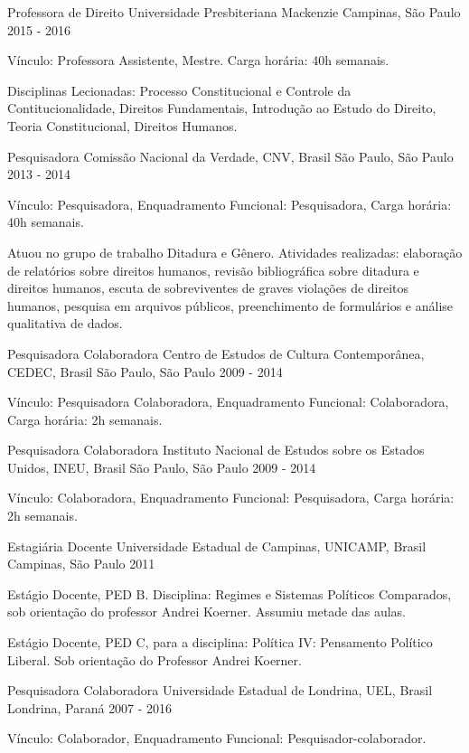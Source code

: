 
\begin{cventries}

  \cventry
  {Professora de Direito}
  {Universidade Presbiteriana Mackenzie}
  {Campinas, São Paulo}
  {2015 - 2016}
  {
  \begin{cvitems}
    \item Vínculo: Professora Assistente, Mestre. Carga horária: 40h semanais.
    \item Disciplinas Lecionadas: Processo Constitucional e Controle da Contitucionalidade, Direitos Fundamentais, Introdução ao Estudo do Direito, Teoria Constitucional, Direitos Humanos.
  \end{cvitems}
  }

\cventry
{Pesquisadora}
{Comissão Nacional da Verdade, CNV, Brasil}
{São Paulo, São Paulo}
{2013 - 2014}
{
\begin{cvitems}
  \item Vínculo: Pesquisadora, Enquadramento Funcional: Pesquisadora, Carga horária: 40h semanais.
  \item Atuou no grupo de trabalho Ditadura e Gênero. Atividades realizadas: elaboração de relatórios sobre direitos humanos, revisão bibliográfica sobre ditadura e direitos humanos, escuta de sobreviventes de graves violações de direitos humanos, pesquisa em arquivos públicos, preenchimento de formulários e análise qualitativa de dados.
\end{cvitems}
}

\cventry
{Pesquisadora Colaboradora}
{Centro de Estudos de Cultura Contemporânea, CEDEC, Brasil}
{São Paulo, São Paulo}
{2009 - 2014}
{
\begin{cvitems}
  \item Vínculo: Pesquisadora Colaboradora, Enquadramento Funcional: Colaboradora, Carga horária: 2h semanais.
\end{cvitems}
}

\cventry
{Pesquisadora Colaboradora}
{Instituto Nacional de Estudos sobre os Estados Unidos, INEU, Brasil}
{São Paulo, São Paulo}
{2009 - 2014}
{
\begin{cvitems}
  \item Vínculo: Colaboradora, Enquadramento Funcional: Pesquisadora, Carga horária: 2h semanais.
\end{cvitems}
}

\cventry
{Estagiária Docente}
{Universidade Estadual de Campinas, UNICAMP, Brasil}
{Campinas, São Paulo}
{2011}
{
\begin{cvitems}
  \item Estágio Docente, PED B. Disciplina: Regimes e Sistemas Políticos Comparados, sob orientação do professor Andrei Koerner. Assumiu metade das aulas.
  \item Estágio Docente, PED C, para a disciplina: Política IV: Pensamento Político Liberal. Sob orientação do Professor Andrei Koerner.
\end{cvitems}
}

\cventry
{Pesquisadora Colaboradora}
{Universidade Estadual de Londrina, UEL, Brasil}
{Londrina, Paraná}
{2007 - 2016}
{
\begin{cvitems}
  \item Vínculo: Colaborador, Enquadramento Funcional: Pesquisador-colaborador.
\end{cvitems}
}

\end{cventries}
